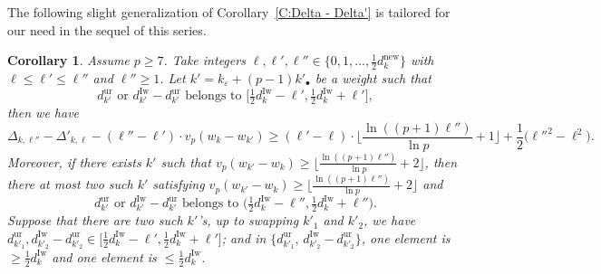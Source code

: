 \documentclass[12pt]{amsart}
\newtheorem{corollary}[subsection]{Corollary}
\theoremstyle{definition}
\numberwithin{equation}{subsection}
\newcommand{\new}{\mathrm{new}}
\newcommand{\Iw}{\mathrm{Iw}}
\newcommand{\ur}{\mathrm{ur}}
\begin{document}
The following slight generalization of Corollary~\ref{C:Delta - Delta'} is tailored for our need in the sequel of this series.
\begin{corollary}
\label{C:Delta - Delta' multi}
Assume $p \geq 7$. Take integers $\ell, \ell', \ell'' \in \{0,1, \dots, \frac 12d_k^\new\}$ with $\ell \leq \ell'\leq  \ell''$ and $\ell''\geq 1$.
Let $k' = k_\varepsilon + (p-1)k'_{\bullet}$ be a weight such that
$$
d_{k'}^\ur \textrm{ or } d_{k'}^\Iw - d_{k'}^\ur \textrm{ belongs to } \big[\tfrac 12d_k^\Iw-\ell', \tfrac 12 d_k^\Iw+\ell'\big],
$$
then we have
\begin{equation}
\label{E:Delta l'' -Delta l}
\Delta_{k, \ell''}- \Delta'_{k, \ell} - (\ell''-\ell') \cdot  v_p(w_k - w_{k'}) \geq (\ell'-\ell) \cdot \Big\lfloor \frac{\ln((p+1)\ell'')}{\ln p}+1\Big\rfloor + \frac 12\big( \ell''^2 - \ell^2\big).
\end{equation}
Moreover, if there exists $k'$ such that $v_p(w_{k'}-w_k) \geq \big\lfloor \frac{\ln((p+1)\ell'')}{\ln p}+2\big\rfloor $, then there at most two such $k'$ satisfying $v_p(w_{k'}-w_k) \geq \big\lfloor \frac{\ln((p+1)\ell'')}{\ln p}+2\big\rfloor $ and
$$
d_{k'}^\ur \textrm{ or } d_{k'}^\Iw - d_{k'}^\ur \textrm{ belongs to } \big(\tfrac 12d_k^\Iw-\ell'', \tfrac 12 d_k^\Iw+\ell''\big).
$$ 
Suppose that there are two such $k'$'s, up to swapping $k'_1$ and $k'_2$, we have $d_{k'_1}^\ur, d_{k'_2}^\Iw-d_{k'_2}^\ur \in \big[\frac 12d_k^\Iw-\ell', \frac 12d_k^\Iw+\ell'\big]$; and in $\{d_{k'_1}^\ur,\, d_{k'_2}^\Iw-d_{k'_2}^\ur\}$, one element is $ \geq \frac 12 d_k^\Iw$ and one element is $ \leq \frac 12 d_k^\Iw$.
\end{corollary}
\end{document}
